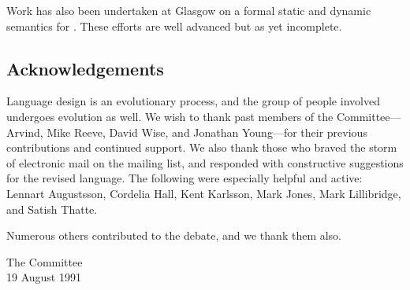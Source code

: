 Work has also been undertaken at Glasgow on a formal static and
dynamic semantics for \Haskell{}
\cite{dynamic-semantics,static-semantics}.  These efforts are well
advanced but as yet incomplete.

\subsection*{Acknowledgements}

Language design is an evolutionary process, and the group of people
involved undergoes evolution as well.  We wish to thank past members
of the \Haskell{} Committee---Arvind, Mike Reeve, David Wise, and
Jonathan Young---for their previous contributions and continued
support.  We also thank those who braved the storm of electronic mail
on the \Haskell{} mailing list, and responded with constructive
suggestions for the revised language.  The following were especially
helpful and active:
Lennart Augustsson,
Cordelia Hall,
Kent Karlsson,
Mark Jones,
Mark Lillibridge,
and Satish Thatte.  


Numerous others contributed to the debate, and we thank them also.

\begin{flushright}
The \Haskell{} Committee\\
19 August 1991
\end{flushright}


